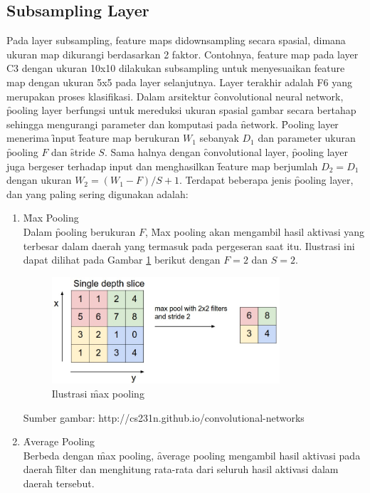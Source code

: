 \subsection{Subsampling Layer}
Pada layer subsampling, feature maps didownsampling secara spasial, dimana ukuran map dikurangi berdasarkan 2 faktor. Contohnya, feature map pada layer C3 dengan ukuran 10x10 dilakukan subsampling untuk menyesuaikan feature map dengan ukuran 5x5 pada layer selanjutnya. Layer terakhir adalah F6 yang merupakan proses klasifikasi.
Dalam arsitektur \f{convolutional neural network}, \f{pooling layer} berfungsi untuk mereduksi ukuran spasial gambar secara bertahap sehingga mengurangi parameter dan komputasi pada \f{network}. \f{Pooling layer} menerima \f{input} \f{feature map} berukuran $W_{1}$ sebanyak $D_{1}$ dan parameter ukuran \f{pooling} $F$ dan \f{stride} $S$. Sama halnya dengan \f{convolutional layer}, \f{pooling layer} juga bergeser terhadap input dan menghasilkan \f{feature map} berjumlah $D_{2} = D_{1}$ dengan ukuran $W_{2} = (W_{1} - F)/S + 1$. Terdapat beberapa jenis \f{pooling layer}, dan yang paling sering digunakan adalah:

\begin{enumerate}
	\item \f{Max Pooling} \\
	Dalam \f{pooling} berukuran $F$, \f{Max pooling} akan mengambil hasil aktivasi yang terbesar dalam daerah yang termasuk pada pergeseran saat itu. Ilustrasi ini dapat dilihat pada Gambar \ref{fig:maxpool} berikut dengan $F = 2$ dan $S = 2$.
	
	\begin{figure}
		\centering
		\includegraphics[width=0.8\textwidth,height=0.35\textwidth]
		{pics/maxpool.jpeg}
		\caption{Ilustrasi \f{max pooling}}
		\label{fig:maxpool}
	\end{figure}
	\vspace{-1.2cm}
	\begin{center}
		{\small Sumber gambar: http://cs231n.github.io/convolutional-networks}
	\end{center}
	
	\item \f{Average Pooling} \\
	Berbeda dengan \f{max pooling}, \f{average pooling} mengambil hasil aktivasi pada daerah \f{filter} dan menghitung rata-rata dari seluruh hasil aktivasi dalam daerah tersebut.
\end{enumerate}
